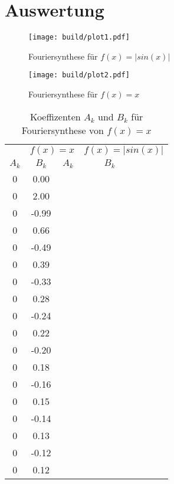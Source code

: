 \newpage
\section{Auswertung}
\label{sec:Auswertung}




\begin{figure}
    \centering
    \texttt{[image: build/plot1.pdf]}
    \caption{Fouriersynthese für $f(x)=|sin(x)|$}
    \label{fig:FS_sin}
\end{figure}



\begin{figure}
    \centering
    \texttt{[image: build/plot2.pdf]}
    \caption{Fouriersynthese für $f(x)=x$}
    \label{fig:FS_sin}
\end{figure}

\begin{table}
\centering
\caption{Koeffizenten $A_k$ und $B_k$ für Fouriersynthese von $f(x)=x$}
\label{tab:K_x}
    \begin{tabular}{c c c c}
        \toprule
        & \multicolumn{2}{c}{$f(x)=x$} & \multicolumn{2}{c}{$f(x)=|sin(x)|$} \\
        \cmidrule(lr){1-2}\cmidrule(lr){3-4}
        $A_k$ & $B_k$ & $A_k$ & $B_k$\\
        \midrule
        0 &  0.00 \\
        0 &  2.00 \\
        0 & -0.99 \\
        0 &  0.66 \\
        0 & -0.49 \\
        0 &  0.39 \\
        0 & -0.33 \\
        0 &  0.28 \\
        0 & -0.24 \\
        0 &  0.22 \\
        0 & -0.20 \\
        0 &  0.18 \\
        0 & -0.16 \\
        0 &  0.15 \\
        0 & -0.14 \\
        0 &  0.13 \\
        0 & -0.12 \\
        0 &  0.12 \\
        \bottomrule
    \end{tabular}
\end{table}
